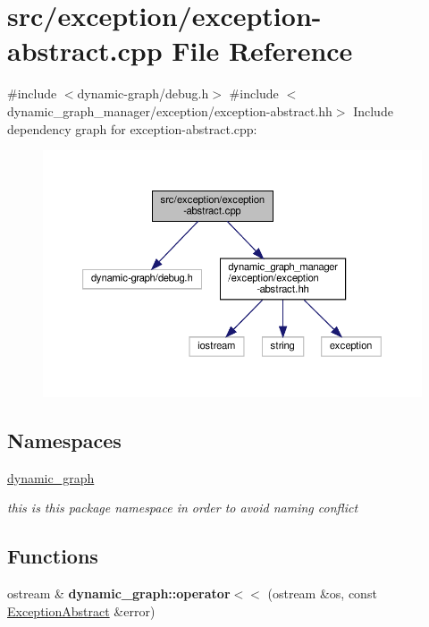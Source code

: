 \hypertarget{exception-abstract_8cpp}{}\section{src/exception/exception-\/abstract.cpp File Reference}
\label{exception-abstract_8cpp}
{\ttfamily \#include $<$dynamic-\/graph/debug.\+h$>$}\newline
{\ttfamily \#include $<$dynamic\+\_\+graph\+\_\+manager/exception/exception-\/abstract.\+hh$>$}\newline
Include dependency graph for exception-\/abstract.cpp\+:
\nopagebreak
\begin{figure}[H]
\begin{center}
\leavevmode
\includegraphics[width=350pt]{exception-abstract_8cpp__incl}
\end{center}
\end{figure}
\subsection*{Namespaces}
\begin{DoxyCompactItemize}
\item 
 \hyperlink{namespacedynamic__graph}{dynamic\+\_\+graph}
\begin{DoxyCompactList}\small\item\em this is this package namespace in order to avoid naming conflict \end{DoxyCompactList}\end{DoxyCompactItemize}
\subsection*{Functions}
\begin{DoxyCompactItemize}
\item 
\mbox{\label{namespacedynamic__graph_a44046716acbcd14008a1672f9bb71594}} 
ostream \& {\bfseries dynamic\+\_\+graph\+::operator$<$$<$} (ostream \&os, const \hyperlink{classdynamic__graph_1_1ExceptionAbstract}{Exception\+Abstract} \&error)
\end{DoxyCompactItemize}


